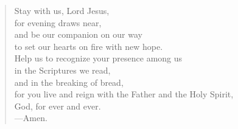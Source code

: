 \prayer

\setlength{\leftmargini}{\prayerleftmargini}

\begin{verse}
Stay with us, Lord Jesus,\\
for evening draws near,\\
and be our companion on our way\\
to set our hearts on fire with new hope.\\
Help us to recognize your presence among us\\
in the Scriptures we read,\\
and in the breaking of bread,\\
for you live and reign with the Father and the Holy Spirit,\\
God, for ever and ever.\\
{\color{red}---\thinspace}Amen.
\end{verse}

\setlength{\leftmargini}{\defleftmargini}